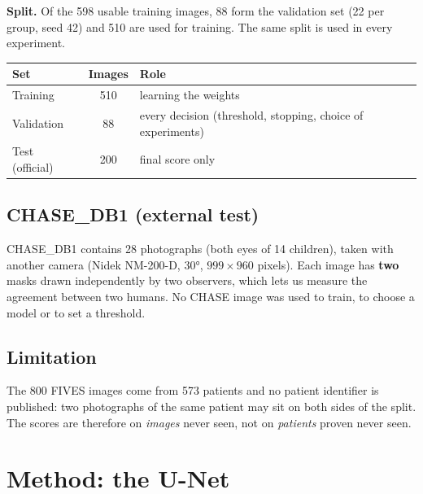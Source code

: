 \documentclass[11pt,a4paper]{article}
\begin{document}
\textbf{Split.} Of the 598 usable training images, 88 form the validation set (22 per group, seed 42) and 510 are used for training. The same split is used in every experiment.

\begin{center}
\begin{tabular}{@{}lcl@{}}
\toprule
\textbf{Set} & \textbf{Images} & \textbf{Role} \\
\midrule
Training & 510 & learning the weights \\
Validation & 88 & every decision (threshold, stopping, choice of experiments) \\
Test (official) & 200 & final score only \\
\bottomrule
\end{tabular}
\end{center}

\subsection{CHASE\_DB1 (external test)}
CHASE\_DB1 \cite{chase} contains 28 photographs (both eyes of 14 children), taken with another camera (Nidek NM-200-D, 30°, $999\times960$ pixels). Each image has \textbf{two} masks drawn independently by two observers, which lets us measure the agreement between two humans. No CHASE image was used to train, to choose a model or to set a threshold.

\subsection{Limitation}
The 800 FIVES images come from 573 patients and no patient identifier is published: two photographs of the same patient may sit on both sides of the split. The scores are therefore on \emph{images} never seen, not on \emph{patients} proven never seen.

\section{Method: the U-Net}
\end{document}
